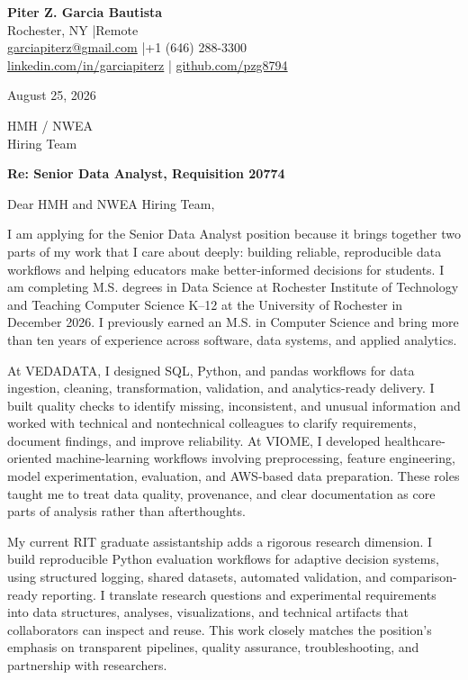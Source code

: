 \documentclass[10pt,letterpaper]{article}
\begin{document}
{\Large\bfseries\color{accent} Piter Z. Garcia Bautista}\\[-1pt]
Rochester, NY \enspace|\enspace Remote\\
\href{mailto:garciapiterz@gmail.com}{garciapiterz@gmail.com}
\enspace|\enspace +1 (646) 288-3300\\
\href{https://linkedin.com/in/garciapiterz}{linkedin.com/in/garciapiterz}
\enspace|\enspace
\href{https://github.com/pzg8794}{github.com/pzg8794}

\vspace{8pt}
August 25, 2026

HMH / NWEA\\
Hiring Team

\textbf{Re: Senior Data Analyst, Requisition 20774}

Dear HMH and NWEA Hiring Team,

I am applying for the Senior Data Analyst position because it brings together
two parts of my work that I care about deeply: building reliable, reproducible
data workflows and helping educators make better-informed decisions for
students. I am completing M.S. degrees in Data Science at Rochester Institute
of Technology and Teaching Computer Science K--12 at the University of
Rochester in December 2026. I previously earned an M.S. in Computer Science and
bring more than ten years of experience across software, data systems, and
applied analytics.

At VEDADATA, I designed SQL, Python, and pandas workflows for data ingestion,
cleaning, transformation, validation, and analytics-ready delivery. I built
quality checks to identify missing, inconsistent, and unusual information and
worked with technical and nontechnical colleagues to clarify requirements,
document findings, and improve reliability. At VIOME, I developed
healthcare-oriented machine-learning workflows involving preprocessing,
feature engineering, model experimentation, evaluation, and AWS-based data
preparation. These roles taught me to treat data quality, provenance, and clear
documentation as core parts of analysis rather than afterthoughts.

My current RIT graduate assistantship adds a rigorous research dimension. I
build reproducible Python evaluation workflows for adaptive decision systems,
using structured logging, shared datasets, automated validation, and
comparison-ready reporting. I translate research questions and experimental
requirements into data structures, analyses, visualizations, and technical
artifacts that collaborators can inspect and reuse. This work closely matches
the position's emphasis on transparent pipelines, quality assurance,
troubleshooting, and partnership with researchers.
\end{document}

